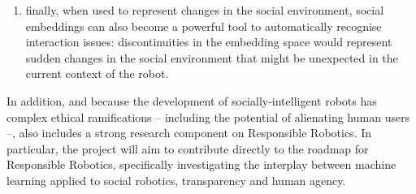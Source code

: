 \begin{enumerate}
\begin{enumerate}
                \item finally, when used to represent changes in the social
                    environment, social embeddings can also become a powerful
                    tool to automatically recognise interaction issues:
                    discontinuities in the embedding space would represent
                    sudden changes in the social environment that might be
                    unexpected in the current context of the robot.

            \end{enumerate}

\end{enumerate}

\noindent In addition, and because the development of socially-intelligent
robots has complex ethical ramifications -- including the potential of
alienating human users --, \project also
includes a strong research component on Responsible Robotics. In particular,
the project will aim to contribute directly to the roadmap for Responsible
Robotics, specifically investigating the interplay between machine learning
applied to social robotics, transparency and human agency.


%
%
%
%
%

